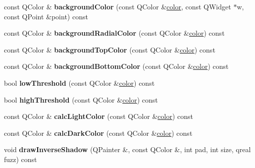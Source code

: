 \begin{DoxyCompactItemize}
const Q\+Color \& {\bfseries background\+Color} (const Q\+Color \&\hyperlink{structcolor}{color}, const Q\+Widget $\ast$w, const Q\+Point \&point) const
\item 
\mbox{\label{class_style_helper_a948c06dc82423737651ddef49f6157db}} 
const Q\+Color \& {\bfseries background\+Radial\+Color} (const Q\+Color \&\hyperlink{structcolor}{color}) const
\item 
\mbox{\label{class_style_helper_af49f22510d283fbdc5905786e5fd59be}} 
const Q\+Color \& {\bfseries background\+Top\+Color} (const Q\+Color \&\hyperlink{structcolor}{color}) const
\item 
\mbox{\label{class_style_helper_adb56210f5fdbbac4fad4fb08a99efb64}} 
const Q\+Color \& {\bfseries background\+Bottom\+Color} (const Q\+Color \&\hyperlink{structcolor}{color}) const
\item 
\mbox{\label{class_style_helper_aae922eae88f315a5485b22d3128f384a}} 
bool {\bfseries low\+Threshold} (const Q\+Color \&\hyperlink{structcolor}{color}) const
\item 
\mbox{\label{class_style_helper_a5f10f20dda4329952173312017090eeb}} 
bool {\bfseries high\+Threshold} (const Q\+Color \&\hyperlink{structcolor}{color}) const
\item 
\mbox{\label{class_style_helper_a73cd50f934669d4f1c7297c3887be778}} 
const Q\+Color \& {\bfseries calc\+Light\+Color} (const Q\+Color \&\hyperlink{structcolor}{color}) const
\item 
\mbox{\label{class_style_helper_addc6f912af11459e8ee7d4352caa88d6}} 
const Q\+Color \& {\bfseries calc\+Dark\+Color} (const Q\+Color \&\hyperlink{structcolor}{color}) const
\item 
\mbox{\label{class_style_helper_a094ba0d6004bf29f0858625f56e4dae6}} 
void {\bfseries draw\+Inverse\+Shadow} (Q\+Painter \&, const Q\+Color \&, int pad, int size, qreal fuzz) const
\item 
\mbox{\label{class_style_helper_abd8eb6bbaa09a2282d1ff795597cf619}} 

\end{DoxyCompactItemize}
